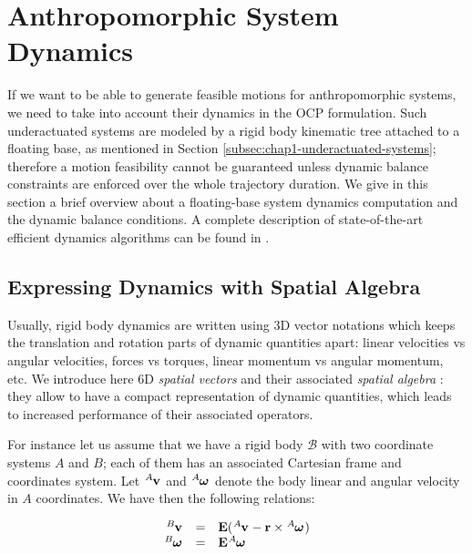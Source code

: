 \section{Anthropomorphic System Dynamics}

If we want to be able to generate feasible motions for anthropomorphic
systems, we need to take into account their dynamics in the OCP
formulation. Such underactuated systems are modeled by a rigid body
kinematic tree attached to a floating base, as mentioned in Section
\ref{subsec:chap1-underactuated-systems}; therefore a motion
feasibility cannot be guaranteed unless dynamic balance constraints
are enforced over the whole trajectory duration. We give in this
section a brief overview about a floating-base system dynamics
computation and the dynamic balance conditions. A complete description
of state-of-the-art efficient dynamics algorithms can be found in
\cite{feat08}.

\subsection{Expressing Dynamics with Spatial Algebra}

Usually, rigid body dynamics are written using 3D vector notations
which keeps the translation and rotation parts of dynamic quantities
apart: linear velocities vs angular velocities, forces vs torques,
linear momentum vs angular momentum, etc. We introduce here 6D
\emph{spatial vectors} and their associated \emph{spatial algebra}
\cite{feat08}: they allow to have a compact representation of dynamic
quantities, which leads to increased performance of their associated
operators.

For instance let us assume that we have a rigid body $\mathcal{B}$
with two coordinate systems $A$ and $B$; each of them has an
associated Cartesian frame and coordinates system. Let
$\tensor*[^A]{\mathbf{v}}{}$ and $\tensor*[^A]{\boldsymbol{\omega}}{}$
denote the body linear and angular velocity in $A$ coordinates. We
have then the following relations:

\begin{equation}
\label{eq:chap3-transf-3d-vectors}
\begin{array}{rcl}
  \tensor*[^B]{\mathbf{v}}{} &=&
  \mathbf{E}(\tensor*[^A]{\mathbf{v}}{} -
  \mathbf{r}\times\tensor*[^A]{\boldsymbol{\omega}}{})\\%
  \tensor*[^B]{\boldsymbol{\omega}}{} &=&
  \mathbf{E}\tensor*[^A]{\boldsymbol{\omega}}{}
\end{array}
\end{equation}

